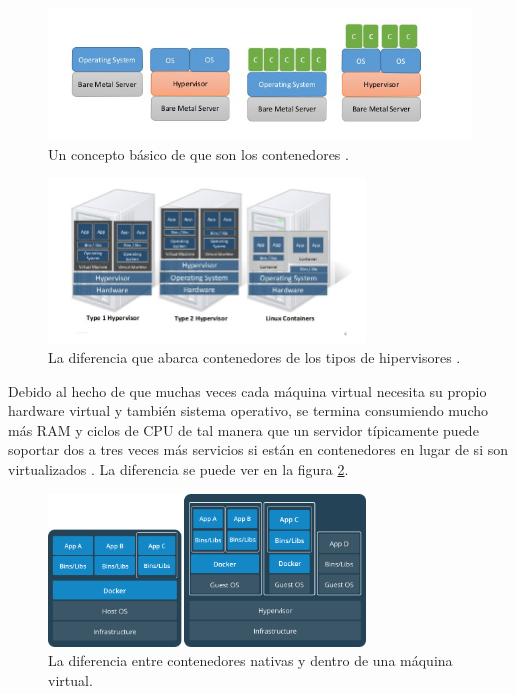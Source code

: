 \begin{figure}
  \begin{center}
      \includegraphics[width=\textwidth]{Figures/que-son-contenedores.jpg}
  \end{center}
  \caption{Un concepto básico de que son los contenedores \citep{Teimouri-Davoud-OS-level-virt}.}
  \label{que-son-contenedores}
\end{figure}

\begin{figure}
  \begin{center}
      \includegraphics[width=0.75\textwidth]{Figures/differencia-hipervisores-contenedores.png}
  \end{center}
  \caption{La diferencia que abarca contenedores de los tipos de hipervisores \citep{Teimouri-Davoud-OS-level-virt}.}
  \label{differencia-hipervisores-contenedores}
\end{figure}

Debido al hecho de que muchas veces cada máquina virtual necesita su propio hardware virtual y también sistema operativo, se termina consumiendo mucho más RAM y ciclos de CPU de tal manera que un servidor típicamente puede soportar dos a tres veces más servicios si están en contenedores en lugar de si son virtualizados \citep{Teimouri-Davoud-OS-level-virt}. La diferencia se puede ver en la figura \ref{differencia-hipervisores-contenedores}.

\begin{figure}
  \begin{center}
      \includegraphics[width=0.75\textwidth]{Figures/contenedores-vms.png}
  \end{center}
  \caption{La diferencia entre contenedores nativas y dentro de una máquina virtual. \citep{Docker-Containers}}
  \label{contenedores-vms}
\end{figure}

